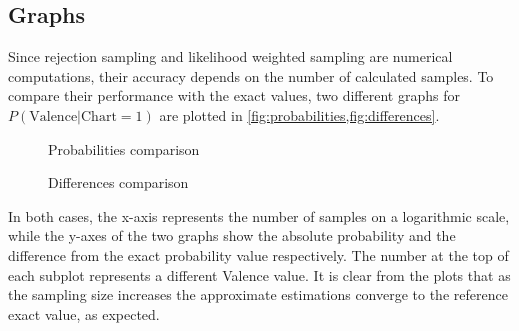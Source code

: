 \documentclass[a4paper, 12pt]{article}
\begin{document}
\subsection{Graphs}

Since rejection sampling and likelihood weighted sampling are numerical computations, their accuracy depends on the number of calculated samples. To compare their performance with the exact values, two different graphs for $P\left(\mathrm{Valence} | \mathrm{Chart} = 1\right)$ are plotted in \cref{fig:probabilities,fig:differences}.

\begin{figure}
    \centering
    \caption{Probabilities comparison}
    \label{fig:probabilities}
\end{figure}

\begin{figure}
    \centering
    \caption{Differences comparison}
    \label{fig:differences}
\end{figure}

In both cases, the x-axis represents the number of samples on a logarithmic scale, while the y-axes of the two graphs show the absolute probability and the difference from the exact probability value respectively. The number at the top of each subplot represents a different Valence value. It is clear from the plots that as the sampling size increases the approximate estimations converge to the reference exact value, as expected.


\clearpage


\printbibliography[heading=bibintoc]
\end{document}
